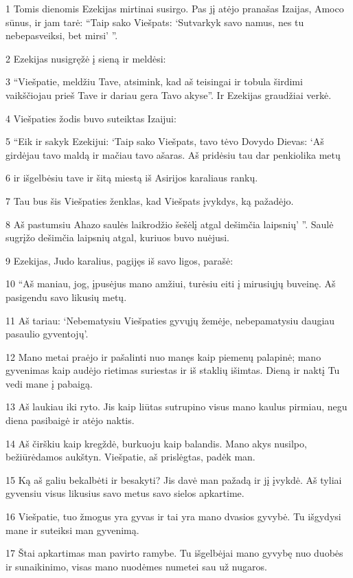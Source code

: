\par 1 Tomis dienomis Ezekijas mirtinai susirgo. Pas jį atėjo pranašas Izaijas, Amoco sūnus, ir jam tarė: “Taip sako Viešpats: ‘Sutvarkyk savo namus, nes tu nebepasveiksi, bet mirsi’ ”. 
\par 2 Ezekijas nusigręžė į sieną ir meldėsi: 
\par 3 “Viešpatie, meldžiu Tave, atsimink, kad aš teisingai ir tobula širdimi vaikščiojau prieš Tave ir dariau gera Tavo akyse”. Ir Ezekijas graudžiai verkė. 
\par 4 Viešpaties žodis buvo suteiktas Izaijui: 
\par 5 “Eik ir sakyk Ezekijui: ‘Taip sako Viešpats, tavo tėvo Dovydo Dievas: ‘Aš girdėjau tavo maldą ir mačiau tavo ašaras. Aš pridėsiu tau dar penkiolika metų 
\par 6 ir išgelbėsiu tave ir šitą miestą iš Asirijos karaliaus rankų. 
\par 7 Tau bus šis Viešpaties ženklas, kad Viešpats įvykdys, ką pažadėjo. 
\par 8 Aš pastumsiu Ahazo saulės laikrodžio šešėlį atgal dešimčia laipsnių’ ”. Saulė sugrįžo dešimčia laipsnių atgal, kuriuos buvo nuėjusi. 
\par 9 Ezekijas, Judo karalius, pagijęs iš savo ligos, parašė: 
\par 10 “Aš maniau, jog, įpusėjus mano amžiui, turėsiu eiti į mirusiųjų buveinę. Aš pasigendu savo likusių metų. 
\par 11 Aš tariau: ‘Nebematysiu Viešpaties gyvųjų žemėje, nebepamatysiu daugiau pasaulio gyventojų’. 
\par 12 Mano metai praėjo ir pašalinti nuo manęs kaip piemenų palapinė; mano gyvenimas kaip audėjo rietimas suriestas ir iš staklių išimtas. Dieną ir naktį Tu vedi mane į pabaigą. 
\par 13 Aš laukiau iki ryto. Jis kaip liūtas sutrupino visus mano kaulus pirmiau, negu diena pasibaigė ir atėjo naktis. 
\par 14 Aš čirškiu kaip kregždė, burkuoju kaip balandis. Mano akys nusilpo, bežiūrėdamos aukštyn. Viešpatie, aš prislėgtas, padėk man. 
\par 15 Ką aš galiu bekalbėti ir besakyti? Jis davė man pažadą ir jį įvykdė. Aš tyliai gyvensiu visus likusius savo metus savo sielos apkartime. 
\par 16 Viešpatie, tuo žmogus yra gyvas ir tai yra mano dvasios gyvybė. Tu išgydysi mane ir suteiksi man gyvenimą. 
\par 17 Štai apkartimas man pavirto ramybe. Tu išgelbėjai mano gyvybę nuo duobės ir sunaikinimo, visas mano nuodėmes numetei sau už nugaros. 
